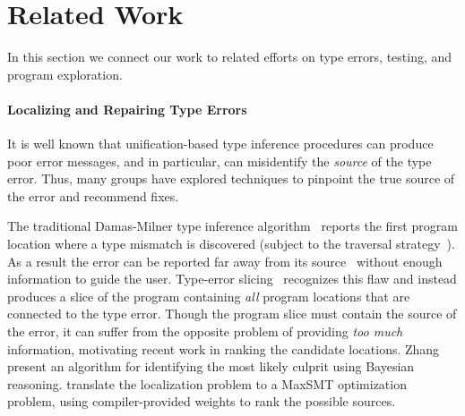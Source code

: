 \section{Related Work}
\label{sec:related-work}
In this section we connect our work to related efforts on type errors,
testing, and program exploration.


\paragraph{Localizing and Repairing Type Errors}
\label{sec:diagnosis-repair}
It is well known that unification-based type inference procedures can
produce poor error messages, and in particular, can misidentify the
\emph{source} of the type error.
%
Thus, many groups have explored techniques to pinpoint the true source
of the error and recommend fixes.

The traditional Damas-Milner type inference
algorithm~\cite{Damas1982-uw} reports the first program location where a
type mismatch is discovered (subject to the traversal
strategy~\cite{Lee1998-ys}).
%
As a result the error can be reported far away from its
source~\cite{McAdam1998-ub} without enough information to guide the
user.
%
Type-error slicing~\cite{Haack2003-vc,Schilling2011-yf,Rahli2015-tt,Sagonas2013-bf,Gast2004-zd,Neubauer2003-xv}
recognizes this flaw and instead produces a slice of the program
containing \emph{all} program locations that are connected to the type
error.
%
%
Though the program slice must contain the source of the error, it can
suffer from the opposite problem of providing \emph{too much}
information, motivating recent work in ranking the candidate locations.
%
Zhang~\etal~\cite{Zhang2014-lv,Zhang2015-yu} present an algorithm for
identifying the most likely culprit using Bayesian reasoning.
%
\citet{Pavlinovic2014-mr,Pavlinovic2015-kh} translate the %
localization problem to a MaxSMT optimization problem, using
compiler-provided weights to rank the possible sources.

